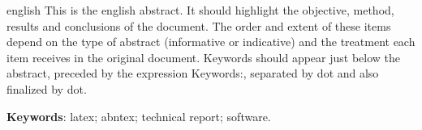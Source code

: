 \begin{resumo}[Abstract]
 \begin{otherlanguage*}{english}
   This is the english abstract. It should highlight the objective, method, results and conclusions of the document. The order and extent of these items depend on the type of abstract (informative or indicative) and the treatment each item receives in the original document. Keywords should appear just below the abstract, preceded by the expression Keywords:, separated by dot and also finalized by dot.

   \vspace{\onelineskip}
 
   \noindent 
   \textbf{Keywords}: latex; abntex; technical report; software.
 \end{otherlanguage*}
\end{resumo}
